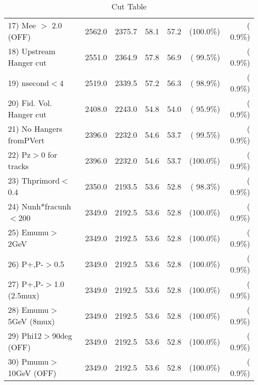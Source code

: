 \begin{table}[h!]
\begin{tabular}{||l||r|r|r|r|r|r||}
 17) Mee $>$ 2.0  (OFF)   &       2562.0 &       2375.7 &         58.1 &         57.2 & (100.0\%) & (  0.9\%) \\
 18) Upstream Hanger cut  &       2551.0 &       2364.9 &         57.8 &         56.9 & ( 99.5\%) & (  0.9\%) \\
 19) nsecond$<$4          &       2519.0 &       2339.5 &         57.2 &         56.3 & ( 98.9\%) & (  0.9\%) \\
 20) Fid. Vol. Hanger cut &       2408.0 &       2243.0 &         54.8 &         54.0 & ( 95.9\%) & (  0.9\%) \\
 21) No Hangers fromPVert &       2396.0 &       2232.0 &         54.6 &         53.7 & ( 99.5\%) & (  0.9\%) \\
 22) Pz$>$0 for tracks    &       2396.0 &       2232.0 &         54.6 &         53.7 & (100.0\%) & (  0.9\%) \\
 23) Thprimord$<$0.4      &       2350.0 &       2193.5 &         53.6 &         52.8 & ( 98.3\%) & (  0.9\%) \\
 24) Nunh*fracunh$<$200   &       2349.0 &       2192.5 &         53.6 &         52.8 & (100.0\%) & (  0.9\%) \\
 25) Emumu$>$2GeV         &       2349.0 &       2192.5 &         53.6 &         52.8 & (100.0\%) & (  0.9\%) \\
 26) P+,P-$>$0.5          &       2349.0 &       2192.5 &         53.6 &         52.8 & (100.0\%) & (  0.9\%) \\
 27) P+,P-$>$1.0 (2.5mux) &       2349.0 &       2192.5 &         53.6 &         52.8 & (100.0\%) & (  0.9\%) \\
 28) Emumu$>$5GeV  (8mux) &       2349.0 &       2192.5 &         53.6 &         52.8 & (100.0\%) & (  0.9\%) \\
 29) Phi12$>$90deg  (OFF) &       2349.0 &       2192.5 &         53.6 &         52.8 & (100.0\%) & (  0.9\%) \\
 30) Pmumu$>$10GeV  (OFF) &       2349.0 &       2192.5 &         53.6 &         52.8 & (100.0\%) & (  0.9\%) \\
 \hline
 \hline
 \end{tabular}
 \caption{Cut Table           }
 \label{tab-cutcohjpsi-mumu_cohpip}
 \end{table}
